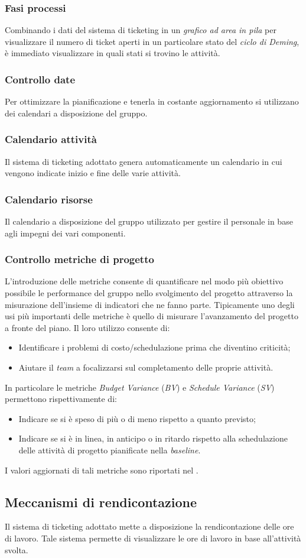 		\subsubsection{Fasi processi}
		Combinando i dati del sistema di ticketing in un \textit{grafico ad area in pila} per visualizzare il numero di ticket aperti in un particolare stato del \textit{ciclo di Deming}, è immediato visualizzare in quali stati si trovino le attività.
		\subsubsection{Controllo date} Per ottimizzare la pianificazione e tenerla in costante aggiornamento si utilizzano dei calendari a disposizione del gruppo.
		\subsubsection{Calendario attività}
		Il sistema di ticketing adottato genera automaticamente un calendario in cui vengono indicate inizio e fine delle varie attività.
		\subsubsection{Calendario risorse} Il calendario a disposizione del gruppo utilizzato per gestire il personale in base agli impegni dei vari componenti.
		\subsubsection{Controllo metriche di progetto} L'introduzione delle metriche consente di quantificare nel modo più obiettivo possibile le performance del gruppo nello svolgimento del progetto attraverso la misurazione dell'insieme di indicatori che ne fanno parte. Tipicamente uno degli usi più importanti delle metriche è quello di misurare l'avanzamento del progetto a fronte del piano. Il loro utilizzo consente di: 
		\begin{itemize}
			\item Identificare i problemi di costo/schedulazione prima che diventino criticità;
			\item Aiutare il \textit{team} a focalizzarsi sul completamento delle proprie attività.
		\end{itemize}
		In particolare le metriche \textit{Budget Variance} (\textit{BV}) e \textit{Schedule Variance} (\textit{SV}) permettono rispettivamente di:
		\begin{itemize}
			\item Indicare se si è speso di più o di meno rispetto a quanto previsto;
			\item Indicare se si è in linea, in anticipo o in ritardo rispetto alla schedulazione delle	attività di progetto pianificate nella \textit{baseline}. 
		\end{itemize}
		I valori aggiornati di tali metriche sono riportati nel \textit{\PdQ}.
	\subsection{Meccanismi di rendicontazione} Il sistema di ticketing adottato mette a disposizione la rendicontazione delle ore di lavoro. Tale sistema permette di visualizzare le ore di lavoro in base all'attività svolta.